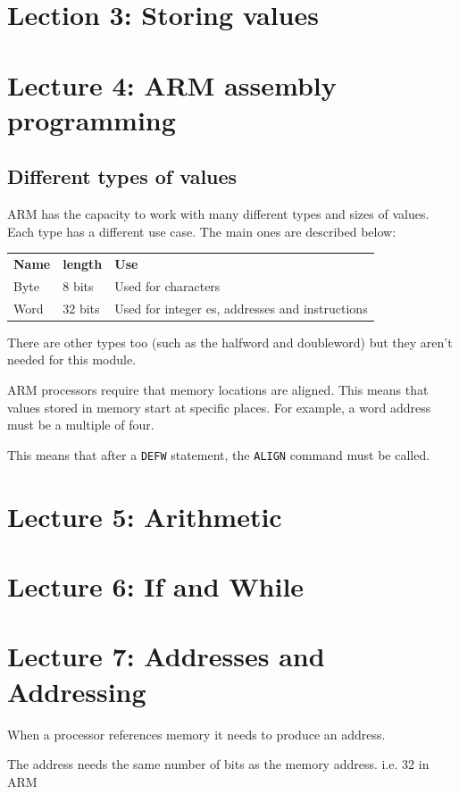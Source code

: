 \documentclass{article}
\begin{document}
\section{Lection 3: Storing values}

\section{Lecture 4: ARM assembly programming}

\subsection{Different types of values}

ARM has the capacity to work with many different types and sizes of values. Each type has a different use case. The main ones are described below:

\begin{tabularx}{\textwidth}{l l X}
	{\bf Name} & {\bf length} & {\bf Use}\\
	Byte & 8 bits & Used for characters\\
	Word & 32 bits & Used for integer es, addresses and instructions\\
\end{tabularx}

There are other types too (such as the halfword and doubleword) but they aren't needed for this module.

ARM processors require that memory locations are aligned. This means that values stored in memory start at specific places. For example, a word address must be a multiple of four.

This means that after a {\tt DEFW} statement, the {\tt ALIGN} command must be called.

\section{Lecture 5: Arithmetic}
\section{Lecture 6: If and While}

\section{Lecture 7: Addresses and Addressing}
When a processor references memory it needs to produce an address.

The address needs the same number of bits as the memory address. i.e. 32 in ARM
\end{document}
